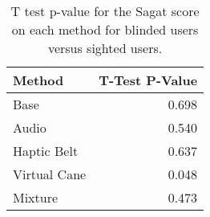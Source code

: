 
\begin{table}[!htb]
\centering
\caption{T test p-value for the Sagat score on each method for blinded users versus sighted users.}
\label{tab:ttest_sagat_score}
\begin{tabular}{lr}
\toprule
      Method &  T-Test P-Value \\
\midrule
        Base &           0.698 \\
       Audio &           0.540 \\
 Haptic Belt &           0.637 \\
Virtual Cane &           0.048 \\
     Mixture &           0.473 \\
\bottomrule
\end{tabular}
\end{table}

